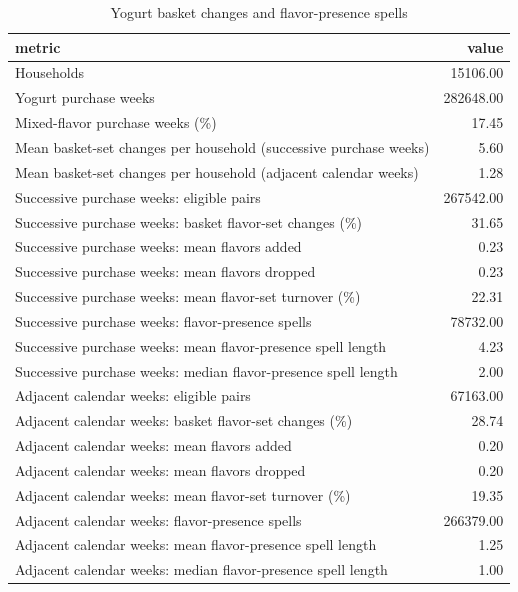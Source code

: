 \begin{table}
\caption{Yogurt basket changes and flavor-presence spells}
\begin{tabular}{lr}
\toprule
metric & value \\
\midrule
Households & 15106.00 \\
Yogurt purchase weeks & 282648.00 \\
Mixed-flavor purchase weeks (\%) & 17.45 \\
Mean basket-set changes per household (successive purchase weeks) & 5.60 \\
Mean basket-set changes per household (adjacent calendar weeks) & 1.28 \\
Successive purchase weeks: eligible pairs & 267542.00 \\
Successive purchase weeks: basket flavor-set changes (\%) & 31.65 \\
Successive purchase weeks: mean flavors added & 0.23 \\
Successive purchase weeks: mean flavors dropped & 0.23 \\
Successive purchase weeks: mean flavor-set turnover (\%) & 22.31 \\
Successive purchase weeks: flavor-presence spells & 78732.00 \\
Successive purchase weeks: mean flavor-presence spell length & 4.23 \\
Successive purchase weeks: median flavor-presence spell length & 2.00 \\
Adjacent calendar weeks: eligible pairs & 67163.00 \\
Adjacent calendar weeks: basket flavor-set changes (\%) & 28.74 \\
Adjacent calendar weeks: mean flavors added & 0.20 \\
Adjacent calendar weeks: mean flavors dropped & 0.20 \\
Adjacent calendar weeks: mean flavor-set turnover (\%) & 19.35 \\
Adjacent calendar weeks: flavor-presence spells & 266379.00 \\
Adjacent calendar weeks: mean flavor-presence spell length & 1.25 \\
Adjacent calendar weeks: median flavor-presence spell length & 1.00 \\
\bottomrule
\end{tabular}
\end{table}
